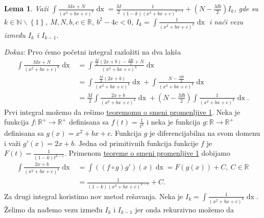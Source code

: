 \documentclass{article}
\newtheorem{lema}{Lema}[section]
\DeclareMathOperator{\dx}{dx}
\begin{document}
\begin{lemabox}
    \label{lema_1.4}
    \begin{lema}
        Važi $\displaystyle\int \frac{Mx+N}{\left(x^2+bx+c\right)^k}\dx=\frac{M}{2}\frac{1}{\left(1-k\right)\left(x^2+bx+c\right)^{k-1}}+\left(N-\frac{Mb}{2}\right)I_k$, gde su $k\in\mathbb{N}\backslash\left\{1\right\}$,
        $M,N,b,c\in\mathbb{R}$, $b^2 - 4c < 0$, $\displaystyle I_k=\int\frac{1}{\left(x^2+bx+c\right)^k}\dx$ i naći vezu između $I_k$ i $I_{k-1}$.
    \end{lema}
\end{lemabox}

\textit{Dokaz:} Prvo ćemo početni integral razložiti na dva lakša
\begin{align*}
    \int \frac{Mx+N}{\left(x^2+bx+c\right)^k}\dx & =\int \frac{\frac{M}{2}\left(2x+b\right)-\frac{Mb}{2}+N}{\left(x^2+bx+c\right)^k}\dx                                          \\
                                                 & =\int \frac{\frac{M}{2}\left(2x+b\right)}{\left(x^2+bx+c\right)^k}\dx+\int\frac{N-\frac{Mb}{2}}{\left(x^2+bx+c\right)^k}\dx   \\
                                                 & =\frac{M}{2}\int \frac{2x+b}{\left(x^2+bx+c\right)^k}\dx+\left(N-\frac{Mb}{2}\right)\int\frac{1}{\left(x^2+bx+c\right)^k}\dx.
\end{align*}
Prvi integral možemo da rešimo \hyperref[teorema_1.2]{teoremomu o smeni promenljive 1}. Neka je
funkcija $f: \mathbb{R}^{+}\longrightarrow\mathbb{R}^{+}$ definisana sa
$\displaystyle f\left(t\right)=\frac{1}{t^k}$ i neka je funkcija $g: \mathbb{R}\longrightarrow\mathbb{R}^{+}$
definisana sa $g\left(x\right)=x^2+bx+c$. Funkcija $g$ je diferencijabilna na svom domenu
i važi $g'\left(x\right)=2x+b$. Jedna od primitivnih funkcija funkcije $f$ je $\displaystyle F\left(t\right)=\frac{1}{\left(1-k\right)t^{k-1}}$.
Primenom \hyperref[teorema_1.2]{teoreme o smeni promenljive 1} dobijamo
\begin{align*}
    \int \frac{2x+b}{\left(x^2+bx+c\right)^k}\dx & =\int\left(\left(f\circ g\right)g'\right)\left(x\right)\dx=F\left(g\left(x\right)\right)+C,\ C\in\mathbb{R} \\
                                                 & =\frac{1}{\left(1-k\right)\left(x^2+bx+c\right)^{k-1}}+C.
\end{align*}
Za drugi integral koristimo nov metod rešavanja.
Neka je $\displaystyle I_k=\int\frac{1}{\left(x^2+bx+c\right)^k}\dx$. Želimo da nađemo vezu
između $I_k$ i $I_{k-1}$ jer onda rekurzivno možemo da
\end{document}
